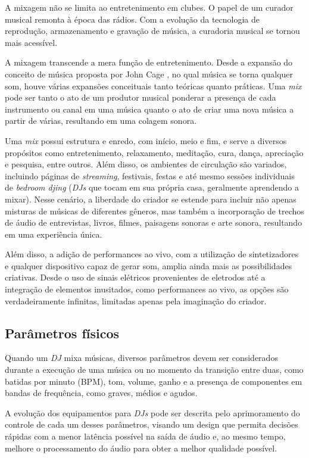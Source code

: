 A mixagem não se limita ao entretenimento em clubes. O papel de um curador musical remonta à época das rádios. Com a evolução da tecnologia de reprodução, armazenamento e gravação de música, a curadoria musical se tornou mais acessível.

A mixagem transcende a mera função de entretenimento. Desde a expansão do conceito de música proposta por John Cage \cite{cage}, no qual música se torna qualquer som, houve várias expansões conceituais tanto teóricas quanto práticas. Uma \textit{mix} pode ser tanto o ato de um produtor musical ponderar a presença de cada instrumento ou canal em uma música quanto o ato de criar uma nova música a partir de várias, resultando em uma colagem sonora.

Uma \textit{mix} possui estrutura e enredo, com início, meio e fim, e serve a diversos propósitos como entretenimento, relaxamento, meditação, cura, dança, apreciação e pesquisa, entre outros. Além disso, os ambientes de circulação são variados, incluindo páginas de \textit{streaming}, festivais, festas e até mesmo sessões individuais de \textit{bedroom djing} (\textit{DJs} que tocam em sua própria casa, geralmente aprendendo a mixar). Nesse cenário, a liberdade do criador se estende para incluir não apenas misturas de músicas de diferentes gêneros, mas também a incorporação de trechos de áudio de entrevistas, livros, filmes, paisagens sonoras e arte sonora, resultando em uma experiência única.

Além disso, a adição de performances ao vivo, com a utilização de sintetizadores e qualquer dispositivo capaz de gerar som, amplia ainda mais as possibilidades criativas. Desde o uso de sinais elétricos provenientes de eletrodos até a integração de elementos inusitados, como performances ao vivo, as opções são verdadeiramente infinitas, limitadas apenas pela imaginação do criador.

\subsection{Parâmetros físicos}

Quando um \textit{DJ} mixa músicas, diversos parâmetros devem ser considerados durante a execução de uma música ou no momento da transição entre duas, como batidas por minuto (BPM), tom, volume, ganho e a presença de componentes em bandas de frequência, como graves, médios e agudos.

A evolução dos equipamentos para \textit{DJs} pode ser descrita pelo aprimoramento do controle de cada um desses parâmetros, visando um design que permita decisões  rápidas com a menor latência possível na saída de áudio e, ao mesmo tempo, melhore o processamento do áudio para obter a melhor qualidade possível.

